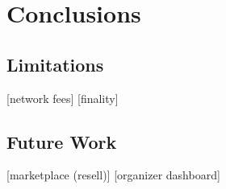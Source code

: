 \chapter{Conclusions}
\label{chap:conclusions}

\section{Limitations}
 [network fees]
 [finality]

\section{Future Work}

 [marketplace (resell)]
 [organizer dashboard]